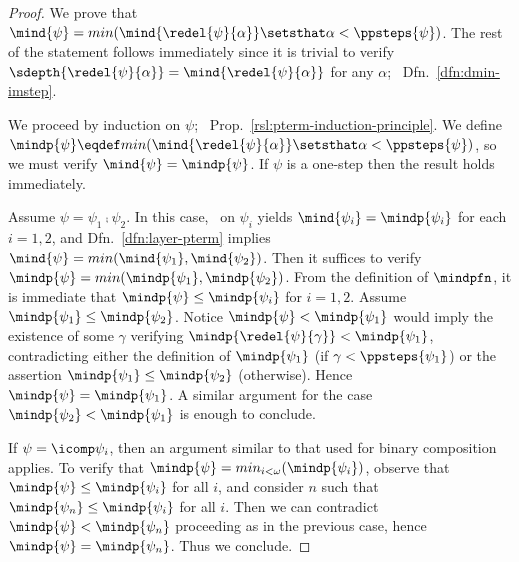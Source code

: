 \begin{proof}
We prove that $\mind{\psi} = min(\mind{\redel{\psi}{\alpha}} \setsthat \alpha < \ppsteps{\psi})$.
The rest of the statement follows immediately since it is trivial to verify $\sdepth{\redel{\psi}{\alpha}} = \mind{\redel{\psi}{\alpha}}$ for any $\alpha$; \confer\ Dfn.~\ref{dfn:dmin-imstep}.

We proceed by induction on $\psi$; \confer\ Prop.~\ref{rsl:pterm-induction-principle}.
We define $\mindp{\psi} \eqdef min(\mind{\redel{\psi}{\alpha}} \setsthat \alpha < \ppsteps{\psi})$, so we must verify $\mind{\psi} = \mindp{\psi}$.
If $\psi$ is a one-step then the result holds immediately.

Assume $\psi = \psi_1 \comp \psi_2$.
In this case, \ih\ on $\psi_i$ yields $\mind{\psi_i} = \mindp{\psi_i}$ for each $i = 1,2$, and Dfn.~\ref{dfn:layer-pterm} implies $\mind{\psi} = min(\mind{\psi_1}, \mind{\psi_2})$.
Then it suffices to verify $\mindp{\psi} = min(\mindp{\psi_1}, \mindp{\psi_2})$.
From the definition of $\mindpfn$, it is immediate that $\mindp{\psi} \leq \mindp{\psi_i}$ for $i = 1,2$.
Assume $\mindp{\psi_1} \leq \mindp{\psi_2}$. Notice $\mindp{\psi} < \mindp{\psi_1}$ would imply the existence of some $\gamma$ verifying $\mindp{\redel{\psi}{\gamma}} < \mindp{\psi_1}$, contradicting either the definition of $\mindp{\psi_1}$ (if $\gamma < \ppsteps{\psi_1}$) or the assertion $\mindp{\psi_1} \leq \mindp{\psi_2}$ (otherwise). Hence $\mindp{\psi} = \mindp{\psi_1}$.
A similar argument for the case $\mindp{\psi_2} < \mindp{\psi_1}$ is enough to conclude.

If $\psi = \icomp \psi_i$, then an argument similar to that used for binary composition applies.
To verify that $\mindp{\psi} = min_{i < \omega}(\mindp{\psi_i})$, observe that $\mindp{\psi} \leq \mindp{\psi_i}$ for all $i$, and consider $n$ such that $\mindp{\psi_n} \leq \mindp{\psi_i}$ for all $i$.
Then we can contradict $\mindp{\psi} < \mindp{\psi_n}$ proceeding as in the previous case, hence $\mindp{\psi} = \mindp{\psi_n}$. Thus we conclude.
\end{proof}


